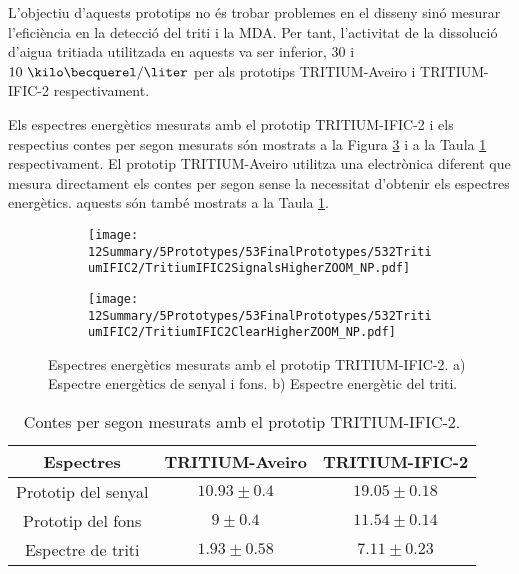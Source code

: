 L'objectiu d'aquests prototips no és trobar problemes en el disseny sinó mesurar l'eficiència en la detecció del triti i la MDA. Per tant, l'activitat de la dissolució d'aigua tritiada utilitzada en aquests va ser inferior, $30$ i $10~\kilo\becquerel/\liter$ per als prototips TRITIUM-Aveiro i TRITIUM-IFIC-2 respectivament.

Els espectres energètics mesurats amb el prototip TRITIUM-IFIC-2 i els respectius contes per segon mesurats són  mostrats a la Figura \ref{fig:EspectresEnergeticsTRITIUMIFIC2} i a la Taula \ref{tab:ContesPerSegonTRITIUMIFIC2} respectivament. El prototip TRITIUM-Aveiro utilitza una electrònica diferent que mesura directament els contes per segon sense la necessitat d'obtenir els espectres energètics. aquests són també mostrats a la Taula \ref{tab:ContesPerSegonTRITIUMIFIC2}.

\begin{figure}
\centering
    \begin{subfigure}[b]{1\textwidth}
    \centering
    \texttt{[image: 12Summary/5Prototypes/53FinalPrototypes/532TritiumIFIC2/TritiumIFIC2SignalsHigherZOOM\_NP.pdf]}  
    \caption{\label{subfig:EspectreEnergeticSenyalFonsTritiumIFIC2}}
    \end{subfigure}
    \hfill
    \begin{subfigure}[b]{1\textwidth}
    \centering
    \texttt{[image: 12Summary/5Prototypes/53FinalPrototypes/532TritiumIFIC2/TritiumIFIC2ClearHigherZOOM\_NP.pdf]}  
    \caption{\label{subfig:EspectreEnergeticTritiTritiumIFIC2}}
    \end{subfigure}
 \caption{Espectres energètics mesurats amb el prototip TRITIUM-IFIC-2. a) Espectre energètics de senyal i fons. b) Espectre energètic del triti.}
 \label{fig:EspectresEnergeticsTRITIUMIFIC2}
\end{figure}

\begin{table}[htbp]
\centering{}%
\begin{tabular}{ccc}
\toprule 
Espectres & TRITIUM-Aveiro & TRITIUM-IFIC-2  \tabularnewline
\midrule
\midrule 
Prototip del senyal & $10.93 \pm 0.4$ & $19.05 \pm 0.18$ \tabularnewline
Prototip del fons & $9 \pm 0.4$ & $11.54 \pm 0.14$ \tabularnewline  
Espectre de triti & $1.93 \pm 0.58$ & $7.11 \pm 0.23$ \tabularnewline
\bottomrule
\end{tabular}
\caption{Contes per segon mesurats amb el prototip TRITIUM-IFIC-2.}
\label{tab:ContesPerSegonTRITIUMIFIC2}
\end{table}

